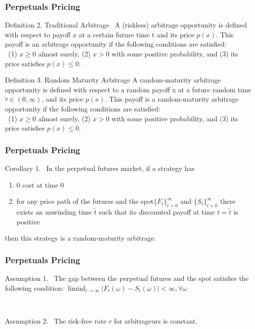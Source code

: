 \documentclass{beamer}
\begin{document}
\begin{frame}
\frametitle{Perpetuals Pricing}
\begin{block}{Definition 2. Traditional Arbitrage}
~A (riskless) arbitrage opportunity is defined with respect to payoff $x$ at a \alert{certain future time t} and its price $p(x)$. This payoff is an arbitrage opportunity if the following conditions are satisfied: \\~(1) $x \geq 0$ almost surely, (2) $x > 0$ with some positive probability, and (3) its price satisfies $p(x) \leq 0$.
\end{block}
\begin{block}{Definition 3. Random Maturity Arbitrage}
A random-maturity arbitrage opportunity is defined with respect to a random payoff x at a \alert{future random time $\tilde\tau \in (0,\infty)$}, and its price $p(x)$. This payoff is a random-maturity arbitrage opportunity if the following conditions are satisfied:\\~(1) $x\geq0$ almost surely, (2) $x>0$ with some positive probability, and (3) its price satisfies $p(x)\leq0$.
\end{block}
\end{frame}

\begin{frame}
\frametitle{Perpetuals Pricing}
\begin{alertblock}{Corollary 1.}
~In the perpetual futures market, if a strategy has \\ \begin{enumerate}[i]
    \item 0 cost at time 0
    \item for any price path of the futures and the spot$\{F_t\}_{t=0}^\infty$ and $\{S_t\}_{t=0}^\infty$ there exists an unwinding time $\tilde t$ such that its discounted payoff at time $t = \tilde t$ is positive
\end{enumerate} 
then this strategy is a random-maturity arbitrage.
\end{alertblock}
\end{frame}

\begin{frame}
\frametitle{Perpetuals Pricing}
\begin{block}{Assumption 1.}
~The gap between the perpetual futures and the spot satisfies the following condition: $\liminf_{t\to\infty}|F_t(\omega)-S_t(\omega)| < \infty, \forall \omega$
\end{block}
~\\
\begin{block}{Assumption 2.}
~The risk-free rate $r$ for arbitrageurs is constant.
\end{block}
\end{frame}
\end{document}
